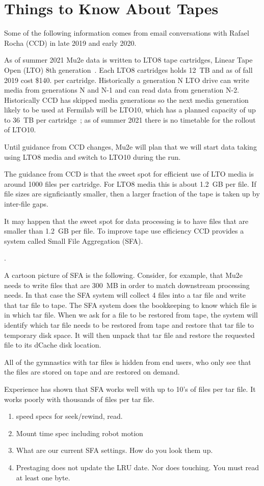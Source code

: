 \chapter{Things to Know About Tapes}
\label{app:AboutTapes}

Some of the following information comes from email conversations with
Rafael Rocha (CCD) in late 2019 and early 2020.

As of summer 2021 Mu2e data is written to LTO8 tape cartridges,
Linear Tape Open (LTO) 8th generation~\cite{LTO}.
Each LTO8 cartridges holds 12~TB and as of fall 2019 cost \$140. per cartridge.
Historically a generation N LTO drive can write media from generations N and N-1
and can read data from generation N-2.
Historically CCD has skipped media generations so the next
media generation likely to be used at Fermilab will be LTO10,
which has a planned capacity of up to 36~TB per cartridge~\cite{LTORoadmap};
as of summer 2021 there is no timetable for the rollout of LTO10.

Until guidance from CCD changes, Mu2e will plan that we will start
data taking using LTO8 media and switch to LTO10 during the run.

The guidance from CCD is that the sweet spot for efficient use of LTO media
is around 1000 files per cartridge.  For LTO8 media this is about 1.2~GB per file.
If file sizes are signficiantly smaller, then a larger fraction of the
tape is taken up by inter-file gaps.

It may happen that the sweet spot for data processing is to have files that
are smaller than 1.2~GB per file.  To improve tape use efficiency CCD
provides a system called Small File Aggregation (SFA).

.

A cartoon picture of SFA is the following.  Consider, for example,
that Mu2e needs to write files that are 300~MB in order to match
downstream processing needs.  In that case the SFA system will collect
4 files into a tar file and write that tar file to tape.  The SFA
system does the bookkeeping to know which file is in which tar file.
When we ask for a file to be restored from tape, the system will
identify which tar file needs to be restored from tape and restore that
tar file to temporary disk space.  It will then unpack that tar file
and restore the requested file to its dCache disk location.

All of the gymnastics with tar files is hidden from end users, who
only see that the files are stored on tape and are restored on demand.

Experience has shown that SFA works well with up to 10's of files
per tar file.  It works poorly with thousands of files per tar file.

\begin{enumerate}
  \item speed specs for seek/rewind, read.
  \item Mount time spec including robot motion
  \item What are our current SFA settings.  How do you look them up.
  \item Prestaging does not update the LRU date.  Nor does touching.  You must read at least one byte.
\end{enumerate}
